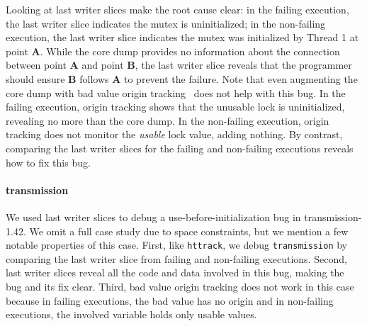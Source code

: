 \documentclass[10pt,nocopyrightspace]{sigplanconf}
\begin{document}
Looking at last writer slices make the root cause clear: in the failing
execution, the last writer slice indicates the mutex is uninitialized; in the
non-failing execution, the last writer slice indicates the mutex was
initialized by Thread 1 at point {\bf A}. While the core dump provides no
information about the connection between point {\bf A} and point {\bf B}, the
last writer slice reveals that the programmer should ensure {\bf B} follows
{\bf A} to prevent the failure.  Note that even augmenting the core dump with
bad value origin tracking~\cite{badapples} does not help with this bug.  In the
failing execution, origin tracking shows that the unusable lock is
uninitialized, revealing no more than the core dump.  In the non-failing
execution, origin tracking does not monitor the {\em usable} lock value, adding
nothing.  By contrast, comparing the last writer slices for the failing and
non-failing executions reveals how to fix this bug.  


\paragraph{transmission} We used last writer slices to debug a
use-before-initialization bug in transmission-1.42.  We omit a full case study
due to space constraints, but we mention a few notable properties of this case.
First, like {\tt httrack}, we debug {\tt transmission} by comparing the last
writer slice from failing and non-failing executions.  Second, last writer
slices reveal all the code and data involved in this bug, making the bug and
its fix clear.   Third, bad value origin tracking does not work in this case
because in failing executions, the bad value has no origin and in non-failing
executions, the involved variable holds only usable values.

%
%
\end{document}
